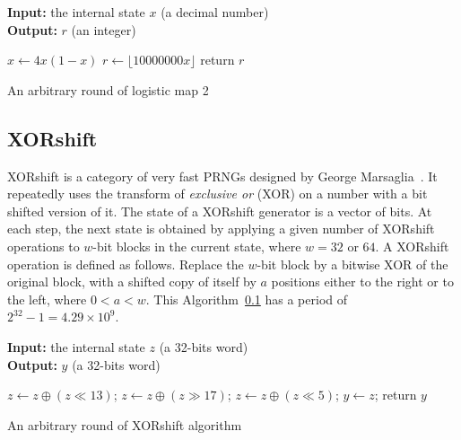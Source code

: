 \begin{algorithm}
\textbf{Input:} the internal state $x$ (a decimal number)\\
\textbf{Output:} $r$ (an integer)
\begin{algorithmic}[1]
\STATE$x\leftarrow{4x(1-x)}$
\STATE$r\leftarrow{\lfloor10000000x\rfloor}$
\STATE return $r$\;
\medskip
\caption{An arbitrary round of logistic map 2}
\label{logisticmap2}
\end{algorithmic}
\end{algorithm}


\subsection{XORshift}
\label{XORshift}

XORshift is a category of very fast PRNGs designed by George Marsaglia~\cite{Marsaglia2003}.
It repeatedly uses the transform of \emph{exclusive or} (XOR) on a number with a bit shifted version of it. The state of a XORshift generator is a vector of bits. At each step, the next state is obtained by applying a given number of XORshift operations to $w$-bit blocks in the current state, where $w = 32$ or $64$. A XORshift operation is defined as follows. Replace the $w$-bit block by a bitwise XOR of the original block, with a shifted copy of itself by $a$ positions either to the right or to the left, where $ 0 < a < w$. This Algorithm~\ref{XORshift} has a period of $2^{32}-1=4.29\times10^9$.


\begin{algorithm}
\textbf{Input:} the internal state $z$ (a 32-bits word)\\
\textbf{Output:} $y$ (a 32-bits word)
\begin{algorithmic}[1]

\STATE$z\leftarrow{z\oplus{(z\ll13)}}$;
\STATE$z\leftarrow{z\oplus{(z\gg17)}}$;
\STATE$z\leftarrow{z\oplus{(z\ll5)}}$;
\STATE$y\leftarrow{z}$;
\STATE return $y$\;
\medskip
\caption{An arbitrary round of XORshift algorithm}
\label{XORshift}
\end{algorithmic}
\end{algorithm}

